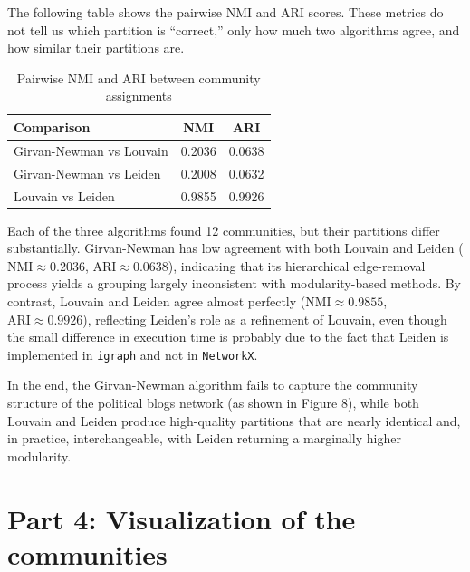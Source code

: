 \documentclass{article}
\begin{document}
The following table shows the pairwise NMI and ARI scores. These metrics do not tell us which partition is “correct,” only how much two algorithms agree, and how similar their partitions are.

\begin{table}[H]
  \centering
  \caption{Pairwise NMI and ARI between community assignments}
  \label{tab:partition-similarity}
  \begin{tabular}{l c c}
    \toprule
    \textbf{Comparison}                 & \textbf{NMI}  & \textbf{ARI}  \\
    \midrule
    Girvan-Newman vs Louvain            & 0.2036        & 0.0638        \\
    Girvan-Newman vs Leiden             & 0.2008        & 0.0632        \\
    Louvain vs Leiden                   & 0.9855        & 0.9926        \\
    \bottomrule
  \end{tabular}
\end{table}

Each of the three algorithms found 12 communities, but their partitions differ substantially. 
Girvan-Newman has low agreement with both Louvain and Leiden 
(\(\mathrm{NMI}\approx0.2036\), \(\mathrm{ARI}\approx0.0638\)), indicating that its hierarchical edge-removal process yields a grouping largely inconsistent with modularity-based methods. 
By contrast, Louvain and Leiden agree almost perfectly 
(\(\mathrm{NMI}\approx0.9855\), \(\mathrm{ARI}\approx0.9926\)), reflecting Leiden's role as a refinement of Louvain, even though the small difference in execution time is probably due to the fact that Leiden is implemented in \texttt{igraph} and not in \texttt{NetworkX}.

In the end, the Girvan-Newman algorithm fails to capture the community structure of the political blogs network (as shown in Figure 8), while both Louvain and Leiden produce high-quality partitions that are nearly identical and, in practice, interchangeable, with Leiden returning a marginally higher modularity.



\section{Part 4: Visualization of the communities}\label{sec:part4}
\newcommand{\FigGNVis}{../images/gn_communities.png}
\newcommand{\FigLouvainVis}{../images/louvain_communities.png}
\newcommand{\FigLeidenVis}{../images/leiden_communities.png}
\end{document}

